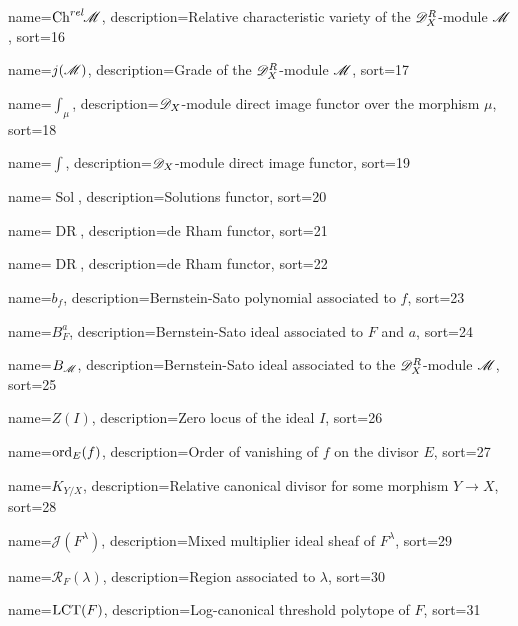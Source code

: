 {
  name={\ensuremath{\Chrel \M}},
  description={Relative characteristic variety of the $\mathscr{D}_X^R$-module $\mathscr{M}$},
  sort=16
}


{
  name={\ensuremath{j(\M)}},
  description={Grade of the $\mathscr{D}_X^R$-module $\mathscr{M}$},
  sort=17
}


{
  name={\ensuremath{\int_\mu}},
  description={$\mathscr{D}_X$-module direct image functor over the morphism $\mu$},
  sort=18
}


{
  name={\ensuremath{\int}},
  description={$\mathscr{D}_X$-module direct image functor},
  sort=19
}


{
  name={\ensuremath{\operatorname{Sol}}},
  description={Solutions functor},
  sort=20
}


{
  name={\ensuremath{\operatorname{DR}}},
  description={de Rham functor},
  sort=21
}


{
  name={\ensuremath{\operatorname{DR}}},
  description={de Rham functor},
  sort=22
}


{
  name={\ensuremath{b_f}},
  description={Bernstein-Sato polynomial associated to $f$},
  sort=23
}


{
  name={\ensuremath{B_F^a}},
  description={Bernstein-Sato ideal associated to $F$ and $a$},
  sort=24
}


{
  name={\ensuremath{B_\M}},
  description={Bernstein-Sato ideal associated to the  $\mathscr{D}_X^R$-module $\mathscr{M}$},
  sort=25
}


{
  name={\ensuremath{Z(I)}},
  description={Zero locus of the ideal $I$},
  sort=26
}


{
  name={\ensuremath{\ord_E(f)}},
  description={Order of vanishing of $f$ on the divisor $E$},
  sort=27
}


{
  name={\ensuremath{K_{Y/X}}},
  description={Relative canonical divisor for some morphism $Y\to X$},
  sort=28
}


{
  name={\ensuremath{\mathcal{J}(F^\lambda)}},
  description={Mixed multiplier ideal sheaf of $F^\lambda$},
  sort=29
}


{
  name={\ensuremath{\mathcal{R}_F(\lambda)}},
  description={Region associated to $\lambda$},
  sort=30
}


{
  name={\ensuremath{\LCT(F)}},
  description={Log-canonical threshold polytope of $F$},
  sort=31
}


